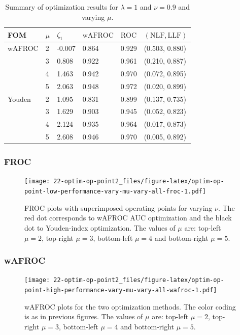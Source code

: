 \documentclass[
]{book}
\begin{document}
\begin{table}

\caption{\label{tab:optim-op-point-high-performance-vary-mu-table-vary-all}Summary of optimization results for $\lambda = 1$ and $\nu = 0.9$ and varying $\mu$.}
\centering
\fontsize{10}{12}\selectfont
\begin{tabular}[t]{llllll}
\toprule
FOM & $\mu$ & $\zeta_1$ & $\text{wAFROC}$ & $\text{ROC}$ & $\left( \text{NLF}, \text{LLF}\right)$\\
\midrule
wAFROC & 2 & -0.007 & 0.864 & 0.929 & (0.503, 0.880)\\
 & 3 & 0.808 & 0.922 & 0.961 & (0.210, 0.887)\\
 & 4 & 1.463 & 0.942 & 0.970 & (0.072, 0.895)\\
 & 5 & 2.063 & 0.948 & 0.972 & (0.020, 0.899)\\
Youden & 2 & 1.095 & 0.831 & 0.899 & (0.137, 0.735)\\
\addlinespace
 & 3 & 1.629 & 0.903 & 0.945 & (0.052, 0.823)\\
 & 4 & 2.124 & 0.935 & 0.964 & (0.017, 0.873)\\
 & 5 & 2.608 & 0.946 & 0.970 & (0.005, 0.892)\\
\bottomrule
\end{tabular}
\end{table}

\hypertarget{froc-5}{%
\subsubsection{FROC}\label{froc-5}}

\begin{figure}
\centering
\texttt{[image: 22-optim-op-point2\_files/figure-latex/optim-op-point-low-performance-vary-mu-vary-all-froc-1.pdf]}
\caption{\label{fig:optim-op-point-low-performance-vary-mu-vary-all-froc}FROC plots with superimposed operating points for varying \(\nu\). The red dot corresponds to wAFROC AUC optimization and the black dot to Youden-index optimization. The values of \(\mu\) are: top-left \(\mu = 2\), top-right \(\mu = 3\), bottom-left \(\mu = 4\) and bottom-right \(\mu = 5\).}
\end{figure}

\hypertarget{wafroc-5}{%
\subsubsection{wAFROC}\label{wafroc-5}}

\begin{figure}
\centering
\texttt{[image: 22-optim-op-point2\_files/figure-latex/optim-op-point-high-performance-vary-mu-vary-all-wafroc-1.pdf]}
\caption{\label{fig:optim-op-point-high-performance-vary-mu-vary-all-wafroc}wAFROC plots for the two optimization methods. The color coding is as in previous figures. The values of \(\mu\) are: top-left \(\mu = 2\), top-right \(\mu = 3\), bottom-left \(\mu = 4\) and bottom-right \(\mu = 5\).}
\end{figure}
\end{document}
